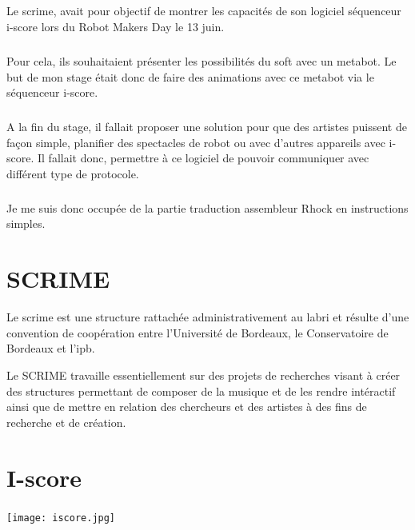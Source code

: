 \documentclass[10pt,a4paper]{report}
\begin{document}
\paragraph{}
Le \acrfull{scrime}, avait pour objectif de montrer les capacités de son logiciel séquenceur i-score lors du Robot Makers Day le 13 juin. 
\paragraph{}
Pour cela, ils souhaitaient présenter les possibilités du soft avec un metabot. Le but de mon stage était donc de faire des animations avec ce metabot via le séquenceur i-score. 
\paragraph{}
A la fin du stage, il fallait proposer une solution pour que des artistes puissent de façon simple, planifier des spectacles de robot ou avec d'autres appareils avec i-score. Il fallait donc, permettre à ce logiciel de pouvoir communiquer avec différent type de protocole.
\paragraph{}
Je me suis donc occupée de la partie traduction assembleur Rhock en instructions simples.



\chapter{SCRIME}
Le \acrshort{scrime} est une structure rattachée administrativement au  \acrfull{labri} et résulte d'une convention de coopération entre l'Université de Bordeaux, le Conservatoire de Bordeaux et l'\acrfull{ipb}.

Le SCRIME travaille essentiellement sur des projets de recherches visant à créer des structures permettant de composer de la musique et de les rendre intéractif ainsi que  de mettre en relation des chercheurs et des artistes à des fins de recherche et de création.

\chapter{I-score}
\paragraph{}

\begin{center}
\texttt{[image: iscore.jpg]}
\end{center}
\end{document}
